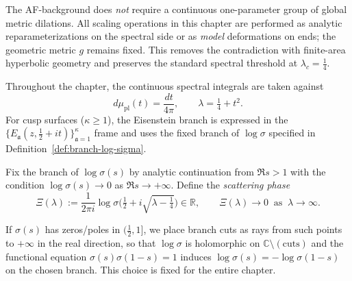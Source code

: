 \begin{remark}\label{rem:no-global-scaling}
The AF-background does \emph{not} require a continuous one-parameter
group of global metric dilations. All scaling operations in this chapter
are performed as analytic reparameterizations on the spectral side or as
\emph{model} deformations on ends; the geometric metric $g$ remains fixed.
This removes the contradiction with finite-area hyperbolic geometry and
preserves the standard spectral threshold at $\lambda_c=\tfrac14$.      %
\end{remark}

\begin{definition}\label{def:plancherel}
Throughout the chapter, the continuous spectral integrals are taken
against
\[
d\mu_{\mathrm{pl}}(t)=\frac{dt}{4\pi},\qquad \lambda=\tfrac14+t^2.
\]
For cusp surfaces ($\kappa\ge 1$), the Eisenstein branch is expressed in
the $\{E_{\mathfrak a}(z,\tfrac12+it)\}_{\mathfrak a=1}^\kappa$ frame and
uses the fixed branch of $\log\sigma$ specified in
Definition~\ref{def:branch-log-sigma}.                                       %
\end{definition}


\begin{definition}\label{def:branch-log-sigma}
Fix the branch of $\log\sigma(s)$ by analytic continuation from
$\Re s>1$ with the condition $\log\sigma(s)\to 0$ as $\Re s\to+\infty$.
Define the \emph{scattering phase}
\[
\Xi(\lambda):=\frac{1}{2\pi i}\log\sigma\!\Big(\tfrac12+i\sqrt{\lambda-\tfrac14}\Big)\in\mathbb{R},
\qquad \Xi(\lambda)\to 0\ \text{ as }\ \lambda\to\infty.
\]
\end{definition}

\begin{remark}\label{rem:branch-cuts}
If $\sigma(s)$ has zeros/poles in $(\tfrac12,1]$, we place branch
cuts as rays from such points to $+\infty$ in the real direction, so that
$\log\sigma$ is holomorphic on $\mathbb{C}\setminus(\text{cuts})$ and the
functional equation $\sigma(s)\sigma(1-s)=1$ induces
$\log\sigma(s)=-\log\sigma(1-s)$ on the chosen branch. This choice is
fixed for the entire chapter.                                                  %
\end{remark}

